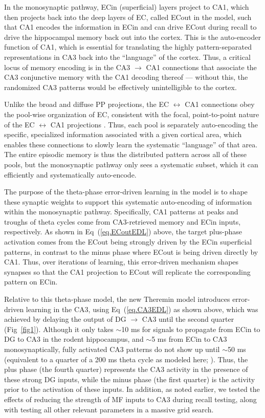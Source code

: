 \documentclass[10pt,letterpaper]{article}
\begin{document}
In the monosynaptic pathway, ECin (superficial) layers project to CA1, which then projects back into the deep layers of EC, called ECout in the model, such that CA1 encodes the information in ECin and can drive ECout during recall to drive the hippocampal memory back out into the cortex.  This is the auto-encoder function of CA1, which is essential for translating the highly pattern-separated representations in CA3 back into the ``language'' of the cortex.  Thus, a critical locus of memory encoding is in the CA3 $\rightarrow$ CA1 connections that associate the CA3 conjunctive memory with the CA1 decoding thereof --- without this, the randomized CA3 patterns would be effectively unintelligible to the cortex.

Unlike the broad and diffuse PP projections, the EC $\leftrightarrow$ CA1 connections obey the pool-wise organization of EC, consistent with the focal, point-to-point nature of the EC $\leftrightarrow$ CA1 projections \cite{WitterDoanJacobsenEtAl17}.  Thus, each pool is separately auto-encoding the specific, specialized information associated with a given cortical area, which enables these connections to slowly learn the systematic ``language'' of that area.  The entire episodic memory is thus the distributed pattern across all of these pools, but the monosynaptic pathway only sees a systematic subset, which it can efficiently and systematically auto-encode.

The purpose of the theta-phase error-driven learning in the \cite{KetzMorkondaOReilly13} model is to shape these synaptic weights to support this systematic auto-encoding of information within the monosynaptic pathway.  Specifically, CA1 patterns at peaks and troughs of theta cycles come from CA3-retrieved memory and ECin inputs, respectively.  As shown in Eq~(\ref{eq.ECoutEDL}) above, the target plus-phase activation comes from the ECout being strongly driven by the ECin superficial patterns, in contrast to the minus phase where ECout is being driven directly by CA1.  Thus, over iterations of learning, this error-driven mechanism shapes synapses so that the CA1 projection to ECout will replicate the corresponding pattern on ECin.

Relative to this theta-phase model, the new Theremin model introduces error-driven learning in the CA3, using Eq~(\ref{eq.CA3EDL}) as shown above, which was achieved by delaying the output of DG $\rightarrow$ CA3 until the second quarter (Fig~\ref{fig1}).  Although it only takes $\sim$10 ms for signals to propagate from ECin to DG to CA3 in the rodent hippocampus, and $\sim$5 ms from ECin to CA3 monosynaptically, fully activated CA3 patterns do not show up until $\sim$50 ms (equivalent to a quarter of a 200 ms theta cycle as modeled here; \cite{NakagamiSaitoMatsuki97}).  Thus, the plus phase (the fourth quarter) represents the CA3 activity in the presence of these strong DG inputs, while the minus phase (the first quarter) is the activity prior to the activation of these inputs.  In addition, as noted earlier, we tested the effects of reducing the strength of MF inputs to CA3 during recall testing, along with testing all other relevant parameters in a massive grid search.
\end{document}
